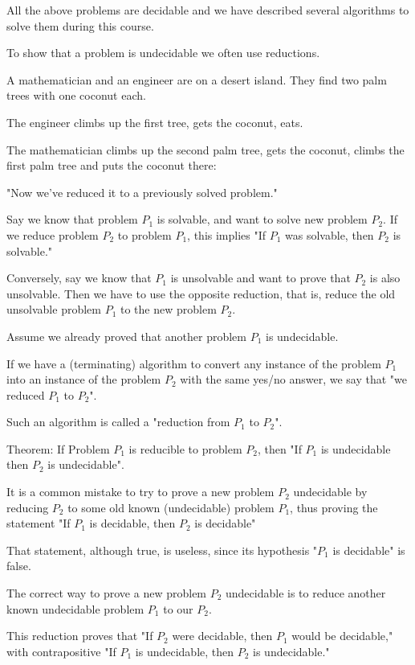 \documentclass{article}
\begin{document}
All the above problems are decidable and we have described several algorithms to solve them during this course.

To show that a problem is undecidable we often use reductions.

A mathematician and an engineer are on a desert island. They find two palm trees with one coconut each.

The engineer climbs up the first tree, gets the coconut, eats.

The mathematician climbs up the second palm tree, gets the coconut, climbs the first palm tree and puts the coconut there:

"Now we've reduced it to a previously solved problem."


Say we know that problem $P_1$ is solvable, and want to solve new problem $P_2$. If we reduce problem $P_2$ to problem $P_1$, this implies "If $P_1$ was solvable, then $P_2$ is solvable."

Conversely, say we know that $P_1$ is unsolvable and want to prove that $P_2$ is also unsolvable. Then we have to use the opposite reduction, that is, reduce the old unsolvable problem $P_1$ to the new problem $P_2$.

Assume we already proved that another problem $P_1$ is undecidable.

If we have a (terminating) algorithm to convert any instance of the problem $P_1$ into an instance of the problem $P_2$ with the same yes/no answer, we say that "we reduced $P_1$ to $P_2$".

Such an algorithm is called a "reduction from $P_1$ to $P_2$".

Theorem: If Problem $P_1$ is reducible to problem $P_2$, then "If $P_1$ is undecidable then $P_2$ is undecidable".

It is a common mistake to try to prove a new problem $P_2$ undecidable by reducing $P_2$ to some old known (undecidable) problem $P_1$, thus proving the statement "If $P_1$ is decidable, then $P_2$ is decidable"

That statement, although true, is useless, since its hypothesis "$P_1$ is decidable" is false.

The correct way to prove a new problem $P_2$ undecidable is to reduce another known undecidable problem $P_1$ to our $P_2$.

This reduction proves that "If $P_2$ were decidable, then $P_1$ would be decidable," with contrapositive "If $P_1$ is undecidable, then $P_2$ is undecidable."
\end{document}
